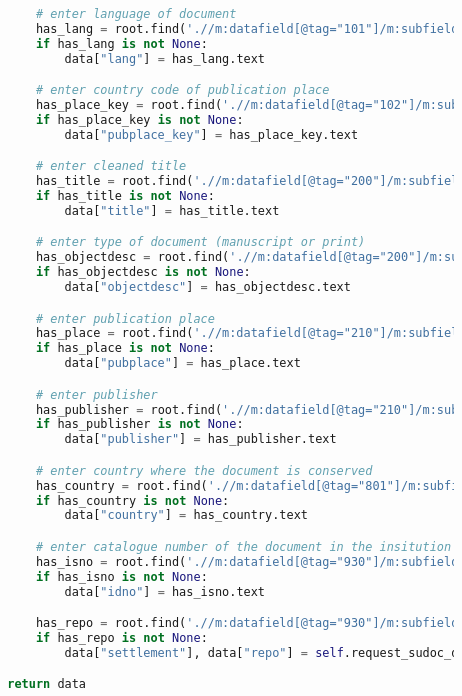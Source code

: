 \documentclass[class=article, crop=false]{standalone}
\begin{document}
\begin{lstlisting}[language=python, style=python]
            
            # enter language of document
            has_lang = root.find('.//m:datafield[@tag="101"]/m:subfield[@code="a"]', namespaces=NS)
            if has_lang is not None:
                data["lang"] = has_lang.text

            # enter country code of publication place
            has_place_key = root.find('.//m:datafield[@tag="102"]/m:subfield[@code="a"]', namespaces=NS)
            if has_place_key is not None:
                data["pubplace_key"] = has_place_key.text

            # enter cleaned title
            has_title = root.find('.//m:datafield[@tag="200"]/m:subfield[@code="a"]', namespaces=NS)
            if has_title is not None:
                data["title"] = has_title.text

            # enter type of document (manuscript or print)
            has_objectdesc = root.find('.//m:datafield[@tag="200"]/m:subfield[@code="b"]', namespaces=NS)
            if has_objectdesc is not None:
                data["objectdesc"] = has_objectdesc.text

            # enter publication place
            has_place = root.find('.//m:datafield[@tag="210"]/m:subfield[@code="a"]', namespaces=NS)
            if has_place is not None:
                data["pubplace"] = has_place.text

            # enter publisher
            has_publisher = root.find('.//m:datafield[@tag="210"]/m:subfield[@code="c"]', namespaces=NS)
            if has_publisher is not None:
                data["publisher"] = has_publisher.text   

            # enter country where the document is conserved
            has_country = root.find('.//m:datafield[@tag="801"]/m:subfield[@code="a"]', namespaces=NS)
            if has_country is not None:
                data["country"] = has_country.text

            # enter catalogue number of the document in the insitution
            has_isno = root.find('.//m:datafield[@tag="930"]/m:subfield[@code="a"]', namespaces=NS)
            if has_isno is not None:
                data["idno"] = has_isno.text

            has_repo = root.find('.//m:datafield[@tag="930"]/m:subfield[@code="b"]', namespaces=NS)
            if has_repo is not None:
                data["settlement"], data["repo"] = self.request_sudoc_data(has_repo.text)

        return data
    

\end{lstlisting}
\end{document}
